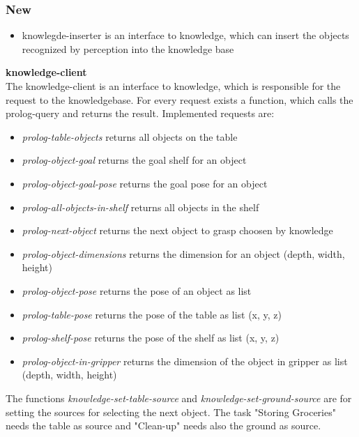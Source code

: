\documentclass[main.tex]{subfiles}
\begin{document}
                \subsubsection{New}
                \begin{itemize}
 				          \item knowlegde-inserter is an interface to knowledge, which can insert the objects recognized by perception into the knowledge base
				        \end{itemize}
				          \textbf{knowledge-client} \\
				          The knowledge-client is an interface to knowledge, which is responsible for the request to the knowledgebase. For every request exists a function, which calls the prolog-query and returns the result. Implemented requests are:
				          \begin{itemize}
				             \item \textit{prolog-table-objects} returns all objects on the table
				             \item \textit{prolog-object-goal} returns the goal shelf for an object
				             \item \textit{prolog-object-goal-pose} returns the goal pose for an object
				             \item \textit{prolog-all-objects-in-shelf} returns all objects in the shelf
				             \item \textit{prolog-next-object} returns the next object to grasp choosen by knowledge
				             \item \textit{prolog-object-dimensions} returns the dimension for an object (depth, width, height)
				             \item \textit{prolog-object-pose} returns the pose of an object as list
				             \item \textit{prolog-table-pose} returns the pose of the table as list (x, y, z)
				             \item \textit{prolog-shelf-pose} returns the pose of the shelf as list (x, y, z)
				             \item \textit{prolog-object-in-gripper} returns the dimension of the object in gripper as list (depth, width, height)
				           \end{itemize} 
				            The functions \textit{knowledge-set-table-source} and \textit{knowledge-set-ground-source} are for setting the sources for selecting the next object. The task "Storing Groceries" needs the table as source and "Clean-up" needs also the ground as source. 
				        
\end{document}
